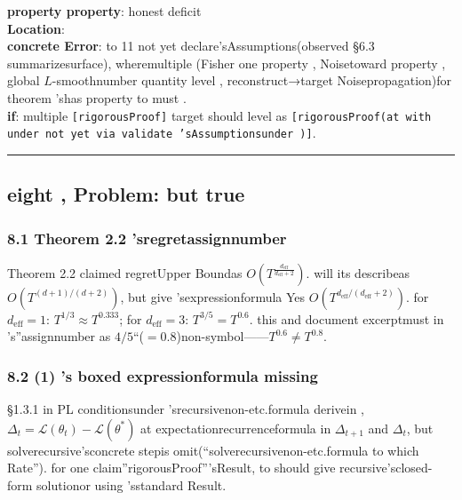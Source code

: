 \documentclass[
  12pt,
]{article}
\begin{document}
\textbf{property property}: honest deficit\\
\textbf{Location}: \\
\textbf{concrete Error}: to  11 not yet declare'sAssumptions(observed §6.3
summarizesurface), wheremultiple (Fisher one property , Noisetoward property , global 
\(L\)-smoothnumber quantity level , reconstruct→target Noisepropagation)for theorem 'shas property to must . \\
\textbf{if}: multiple  \texttt{{[}rigorousProof{]}} target should level as 
\texttt{{[}rigorousProof(at with under not yet via validate 'sAssumptionsunder ){]}}. 

\begin{center}\rule{0.5\linewidth}{0.5pt}\end{center}

\subsection{eight , Problem: but true}\label{ux516bux9644ux52a0ux95eeux9898ux5c0fux4f46ux771fux5b9e}

\subsubsection{8.1 Theorem 2.2
'sregretassignnumber }\label{theorem-2.2-ux7684ux9057ux61beux6307ux6570}

Theorem 2.2 claimed regretUpper Boundas 
\(O(T^{\frac{d_{\text{eff}}}{d_{\text{eff}}+2}})\). will its describeas 
\(O(T^{(d+1)/(d+2)})\), but give 'sexpressionformula Yes
\(O(T^{d_{\text{eff}}/(d_{\text{eff}}+2)})\). for 
\(d_{\text{eff}}=1\): \(T^{1/3} \approx T^{0.333}\); for 
\(d_{\text{eff}}=3\): \(T^{3/5} = T^{0.6}\). this and document excerptmust in 's''assignnumber as 
\(4/5\)``(\(=0.8\))non-symbol------\(T^{0.6} \neq T^{0.8}\). 

\subsubsection{8.2  (1) 's boxed
expressionformula missing}\label{ux65b9ux7a0b-1-ux7684-boxed-ux8868ux8fbeux5f0fux7f3aux5931}

§1.3.1 in  PL
conditionsunder 'srecursivenon-etc.formula derivein , \(\Delta_t = \mathcal{L}(\theta_t) - \mathcal{L}(\theta^*)\)
at expectationrecurrenceformula in  \(\Delta_{t+1}\) and 
\(\Delta_t\), but solverecursive'sconcrete stepis omit(``solverecursivenon-etc.formula to which Rate''). for one claim''rigorousProof'''sResult, to should give recursive'sclosed-form solutionor using 'sstandard Result. 
\end{document}
